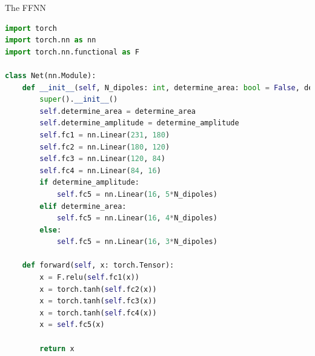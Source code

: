 \documentclass[aspectratio=169]{beamer}
\begin{document}
\begin{frame}[fragile]{The FFNN}
\begin{lstlisting}[language=Python, frame=single, basicstyle=\fontsize{6}{6}\selectfont]
import torch
import torch.nn as nn
import torch.nn.functional as F

class Net(nn.Module):
    def __init__(self, N_dipoles: int, determine_area: bool = False, determine_amplitude: bool = False):
        super().__init__()
        self.determine_area = determine_area
        self.determine_amplitude = determine_amplitude
        self.fc1 = nn.Linear(231, 180)
        self.fc2 = nn.Linear(180, 120)
        self.fc3 = nn.Linear(120, 84)
        self.fc4 = nn.Linear(84, 16)
        if determine_amplitude:
            self.fc5 = nn.Linear(16, 5*N_dipoles)
        elif determine_area:
            self.fc5 = nn.Linear(16, 4*N_dipoles)
        else:
            self.fc5 = nn.Linear(16, 3*N_dipoles)

    def forward(self, x: torch.Tensor):
        x = F.relu(self.fc1(x))
        x = torch.tanh(self.fc2(x))
        x = torch.tanh(self.fc3(x))
        x = torch.tanh(self.fc4(x))
        x = self.fc5(x)

        return x
\end{lstlisting}
\end{frame}
\end{document}
